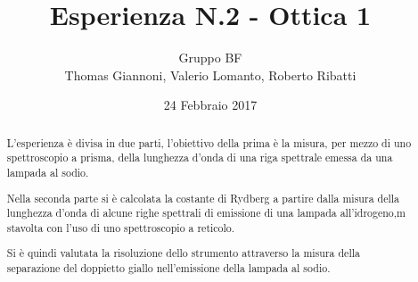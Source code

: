 \documentclass[a4paper,11pt]{article}
\author{Gruppo BF \\ Thomas Giannoni, Valerio Lomanto, Roberto Ribatti}
\title{Esperienza N.2 - Ottica 1}
\date{24 Febbraio 2017}
\begin{document}
\maketitle

\begin{abstract}
L'esperienza è divisa in due parti, l'obiettivo della prima è la misura, per mezzo di uno 
spettroscopio a prisma, della lunghezza d'onda di una riga spettrale
emessa da una lampada al sodio.

Nella seconda parte si è calcolata la costante di Rydberg a partire dalla misura della lunghezza d'onda di alcune righe spettrali di emissione di una lampada all'idrogeno,m stavolta con l'uso di uno spettroscopio a reticolo. 

Si è quindi valutata la risoluzione dello strumento attraverso la misura della separazione del doppietto giallo nell'emissione della lampada al sodio.

\end{abstract}



% 


%
\end{document}

